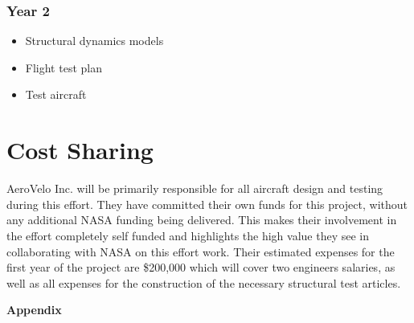 \documentclass[]{aiaa-tc}
\begin{document}
        \subsubsection{Year 2}
            \begin{itemize}
                \item Structural dynamics models 
                \item Flight test plan
                \item Test aircraft
            \end{itemize}


  \section{Cost Sharing}
    AeroVelo Inc. will be primarily responsible for all aircraft design and testing during this effort. 
    They have committed their own funds for this project, without any additional NASA funding being delivered.
    This makes their involvement in the effort completely self funded and highlights the high value they see 
    in collaborating with NASA on this effort work. Their estimated expenses for the first year of the project are \$200,000 
    which will cover two engineers salaries, as well as all expenses for the construction of the necessary 
    structural test articles.



  \clearpage
  

  \appendix

  \clearpage
  \centerline{\huge{\textbf{Appendix}}}
\end{document}
